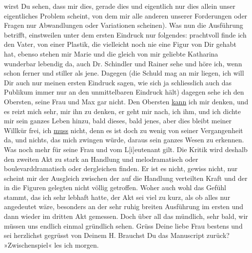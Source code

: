                wirst \label{LL294-2v}Du sehen, dass mir dies, gerade dies und
                  eigentlich nur dies allein unser eigentliches Problem scheint, von dem mir alle
                  anderen unserer Forderungen oder Fragen nur Abwandlungen oder Variationen
                  scheinen\label{LL294-2h}). Was nun die Ausführung betrifft, einstweilen unter {\pb}dem ersten Eindruck nur folgendes: prachtvoll finde ich den Vater, von einer
               Plastik, die vielleicht noch nie eine Figur von Dir gehabt hat, ebenso stehen mir
               Marie und die gleich von mir geliebte Katharina wunderbar lebendig da, auch Dr.
               Schindler und Rainer sehe und höre ich, wenn schon ferner und stiller als jene.
               Dagegen (die Schuld mag an mir liegen, ich will Dir auch nur meinen ersten Eindruck
               sagen, wie sich ja schliesslich auch das Publikum immer nur an den unmittelbaren
               Eindruck hält) dagegen sehe ich den Obersten, seine Frau und Max gar nicht. Den Obersten \uline{kann} ich mir
               denken, und es reizt mich sehr, mir ihn zu denken, er geht mir nach, ich ihm, und ich
               dichte mir sein ganzes Leben hinzu, bald dieses, bald jenes, aber dies bleibt meiner
               Willkür frei, ich \uline{muss} nicht, denn es ist doch zu
               wenig von seiner Vergangenheit da, und nichts, das mich zwingen würde, daraus sein
               ganzes Wesen zu erkennen. Was noch mehr für seine Frau und vom L{[}i{]}eutenant gilt. Die
               Kritik wird deshalb den zweiten Akt zu stark an Handlung und melodramatisch oder
               boulevarddramatisch oder dergleichen finden. Er ist es nicht, gewiss nicht, nur
               scheint mir der Ausgleich zwischen der auf die Handlung verteilten Kraft und der in
               die Figuren gelegten nicht völlig getroffen. Woher auch wohl das Gefühl stammt, das
               ich sehr lebhaft hatte, der Akt sei viel zu kurz, als ob alles nur angedeutet wäre,
               besonders an der sehr ruhig breiten Ausführung im ersten und dann wieder im dritten
               Akt gemessen. Doch über all das mündlich, sehr bald, wir müssen uns endlich einmal
               gründlich sehen. Grüss Deine liebe Frau bestens und sei herzlichst gegrüsst von Deinem\pend
           \pstart \spacefill\mbox{H.}\pend{}
\pstart
           \noindent{}Brauchst Du das Manuscript zurück? »Zwischenspiel« les ich morgen.\pend
           \endnumbering{}  
      